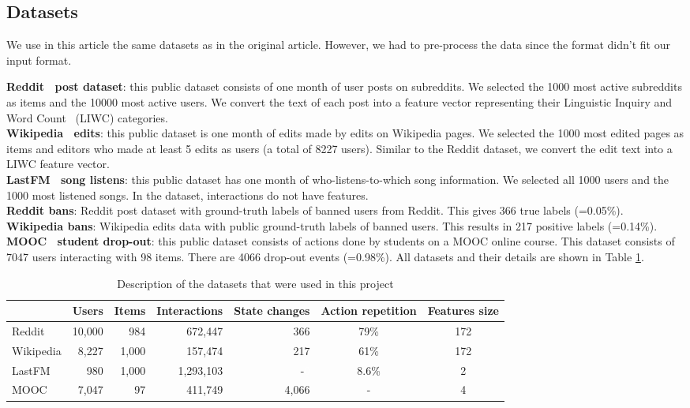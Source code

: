 \subsection{Datasets}
 
We use in this article the same datasets as in the original article. However, we  had to pre-process the data since the format didn't fit our input format.

\textbf{Reddit~\cite{Reddit} post dataset}: this public dataset consists of one month of user posts on subreddits. We selected the 1000 most active subreddits as items and the 10000 most active users. We convert the text of each post into a feature vector representing their Linguistic Inquiry and Word Count~\cite{pennebaker01LIWC} (LIWC) categories.\\
\textbf{Wikipedia~\cite{Wiki} edits}: this public dataset is one month of edits made by edits on Wikipedia pages. We selected the 1000 most edited pages as items and editors who made at least 5 edits as users (a total of 8227 users). Similar to the Reddit dataset, we convert the edit text into a LIWC feature vector.\\
\textbf{LastFM~\cite{10.1007/978-3-642-33486-3_5lastFM} song listens}: this public dataset has one month of who-listens-to-which song information. We selected all 1000 users and the 1000 most listened songs. In the dataset, interactions do not have features.\\
\textbf{Reddit bans}: Reddit post dataset with ground-truth labels of banned users from Reddit. This gives 366 true labels (=0.05\%).\\
\textbf{Wikipedia bans}: Wikipedia edits
data with public ground-truth labels of banned users. This results in 217 positive labels (=0.14\%).\\
\textbf{MOOC~\cite{mooc} student drop-out}: this public dataset consists of actions done by students on a MOOC online course. This dataset consists of 7047 users interacting with 98 items. There are 4066 drop-out events (=0.98\%). All datasets and their details are shown in Table \ref{description data}. \\

\setlength\tabcolsep{0.12cm} %
\begin{table}[htbp]
    \centering
    \begin{tabular}{@{}lrrrrcc@{}}
    \toprule
    & Users & Items & Interactions & State changes & Action repetition & Features size \\
    \midrule
    Reddit & 10,000 & 984 & 672,447 & 366 & 79\% & 172 \\
    Wikipedia & 8,227 & 1,000 & 157,474 & 217 & 61\% & 172 \\
    LastFM & 980 & 1,000 & 1,293,103 & -\textcolor{white}{0} & 8.6\% & 2 \\
    MOOC & 7,047 & 97 & 411,749 & 4,066 & - & 4 \\
    \bottomrule
    \end{tabular}
    \caption{Description of the datasets that were used in this project}
    \label{description data}
\end{table}
\setlength\tabcolsep{6pt} 


